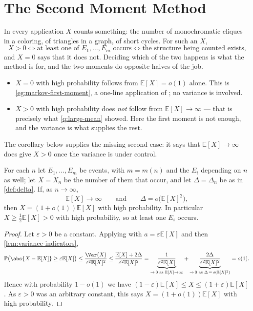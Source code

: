 \section{The Second Moment Method}\label{sec:second-moment-method}

In every application \(X\) counts something: the number of monochromatic cliques in a coloring, of triangles in a graph, of short cycles. For such an \(X\),
\[
    X > 0
    \iff \text{at least one of } E_1, \ldots, E_m \text{ occurs}
    \iff \text{the structure being counted exists,}
\]
and \(X = 0\) says that it does not. Deciding which of the two happens is what the method is for, and the two moments do opposite halves of the job.
\begin{itemize}
    \item \(X = 0\) with high probability follows from \(\mathbb{E}[X] = o(1)\) alone. This is \autoref{eg:markov-first-moment}, a one-line application of ; no variance is involved.
    \item \(X > 0\) with high probability does \emph{not} follow from \(\mathbb{E}[X] \to \infty\) --- that is precisely what \autoref{q:large-mean} showed. Here the first moment is not enough, and the variance is what supplies the rest.
\end{itemize}
The corollary below supplies the missing second case: it says that \(\mathbb{E}[X] \to \infty\) does give \(X > 0\) once the variance is under control.

\begin{corollary}\label{cor:second-moment}
    For each \(n\) let \(E_1, \ldots, E_m\) be events, with \(m = m(n)\) and the \(E_i\) depending on \(n\) as well; let \(X = X_n\) be the number of them that occur, and let \(\Delta = \Delta_n\) be as in \autoref{def:delta}. If, as \(n \to \infty\),
    \[
        \mathbb{E}[X] \to \infty
        \qquad\text{and}\qquad
        \Delta = o\bigl( \mathbb{E}[X]^{2} \bigr),
    \]
    then \(X = (1 + o(1)) \mathbb{E}[X]\) with high probability. In particular \(X \ge \frac{1}{2}\mathbb{E}[X] > 0\) with high probability, so at least one \(E_i\) occurs.
\end{corollary}

\begin{proof}
    Let \(\varepsilon > 0\) be a constant. Applying  with \(a = \varepsilon \mathbb{E}[X]\) and then \autoref{lem:variance-indicators},
    \[
        \mathbb{P}\bigl( \abs{X - \mathbb{E}[X]} \ge \varepsilon \mathbb{E}[X] \bigr)
        \le \frac{\Var(X)}{\varepsilon^{2} \mathbb{E}[X]^{2}}
        \le \frac{\mathbb{E}[X] + 2\Delta}{\varepsilon^{2} \mathbb{E}[X]^{2}}
        = \underbrace{\frac{1}{\varepsilon^{2} \mathbb{E}[X]}}_{\to\, 0 \text{ as } \mathbb{E}[X] \to \infty}
        + \underbrace{\frac{2\Delta}{\varepsilon^{2} \mathbb{E}[X]^{2}}}_{\to\, 0 \text{ as } \Delta \,=\, o(\mathbb{E}[X]^{2})}
        = o(1).
    \]
    Hence with probability \(1 - o(1)\) we have \((1-\varepsilon)\mathbb{E}[X] \le X \le (1+\varepsilon)\mathbb{E}[X]\). As \(\varepsilon > 0\) was an arbitrary constant, this says \(X = (1+o(1))\mathbb{E}[X]\) with high probability.
\end{proof}

